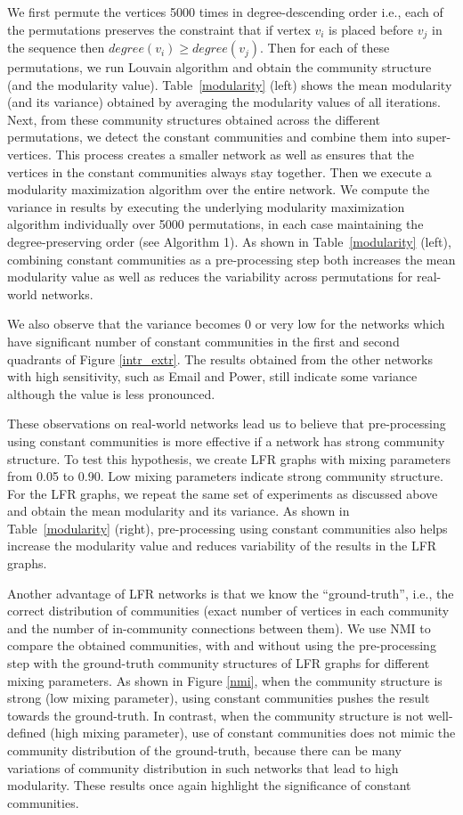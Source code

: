 We first permute the vertices 5000 times in degree-descending order i.e., each of the permutations preserves the constraint
that if vertex
$v_i$ is placed before $v_j$ in the sequence then $degree(v_i) \ge degree(v_j)$. Then for each of these permutations,
we run Louvain algorithm and obtain the community structure (and the modularity value). Table~\ref{modularity} (left) shows the
mean modularity (and its variance) obtained by averaging the modularity values of all iterations. Next, from these community structures
obtained across the different permutations, we
detect the constant
communities and combine them into super-vertices.
This process creates a smaller network as well as ensures
 that the vertices in the constant communities always stay together. Then we execute a modularity maximization algorithm
over the entire network. We compute the variance in results by executing
the
underlying modularity maximization algorithm individually over 5000 permutations, in each case maintaining the degree-preserving order
(see Algorithm 1). As
shown in Table~\ref{modularity}
(left), combining constant communities as a pre-processing step both increases the mean modularity value as well as reduces the variability
across permutations for real-world networks.

We also observe that the variance becomes 0 or very low for the networks which have significant number of constant
communities in the first and second quadrants of Figure \ref{intr_extr}. The results obtained from the other
networks with high sensitivity, such as Email and Power, still indicate some variance although the value is less pronounced.


 These observations on real-world networks lead us to believe that pre-processing using constant communities is more effective if a network
has strong community structure. To test this hypothesis, we create
LFR graphs with mixing parameters from 0.05 to 0.90. Low mixing parameters indicate strong community structure. For the LFR
graphs, we repeat the same set of experiments as discussed above and obtain the mean modularity and its variance. As shown in
Table~\ref{modularity} (right), pre-processing using constant communities also helps increase the modularity value and reduces variability
of the results in the LFR graphs.

Another advantage of LFR networks is that we know the ``ground-truth'', i.e., the correct distribution of
communities (exact number of vertices in each community and the number of in-community connections between them). We use
NMI to
compare the obtained communities, with and without using the pre-processing step with the ground-truth community structures of LFR
graphs
for different mixing parameters. As
shown in Figure \ref{nmi}, when the community structure is strong (low mixing parameter), using constant
communities pushes the result towards the ground-truth. In contrast, when the
community structure is not well-defined (high mixing parameter), use of constant communities does not mimic the
community distribution of the ground-truth, because there can be many variations of community distribution in
such networks that lead to high modularity. These results once again highlight the significance of constant
communities.

